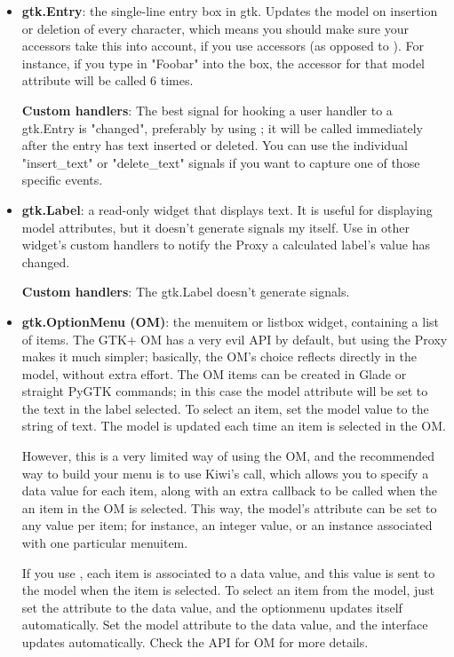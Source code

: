 \documentclass[a4paper]{howto}
\begin{document}
\begin{itemize}
\item {\bf gtk.Entry}: the single-line entry box in gtk. Updates the
model on insertion or deletion of every character, which means you
should make sure your accessors take this into account, if you use
accessors (as opposed to ). For instance, if you type in
"Foobar" into the box, the accessor for that model attribute will be
called 6 times.

{\bf Custom handlers}: The best signal for hooking a user handler to a
gtk.Entry is "changed", preferably by using ; it will be called immediately after the entry
has text inserted or deleted. You can use the individual "insert\_text"
or "delete\_text" signals if you want to capture one of those specific
events.

\item {\bf gtk.Label}: a read-only widget that displays text. It is
useful for displaying model attributes, but it doesn't generate signals
my itself. Use  in other widget's custom handlers to
notify the Proxy a calculated label's value has changed.

{\bf Custom handlers}: The gtk.Label doesn't generate signals.

\item {\bf gtk.OptionMenu (OM)}: the menuitem or listbox widget,
containing a list of items. The GTK+ OM has a very evil API by default,
but using the Proxy makes it much simpler; basically, the OM's choice
reflects directly in the model, without extra effort. The OM items can
be created in Glade or straight PyGTK commands; in this case the model
attribute will be set to the text in the label selected. To select an
item, set the model value to the string of text. The model is updated
each time an item is selected in the OM.

However, this is a very limited way of using the OM, and the recommended
way to build your menu is to use Kiwi's 
call, which allows you to specify a data value for each item, along with
an extra callback to be called when the an item in the OM is selected.
This way, the model's attribute can be set to any value per item; for
instance, an integer value, or an instance associated with one
particular menuitem.

If you use , each item is associated to a data value,
and this value is sent to the model when the item is selected. To select
an item from the model, just set the attribute to the data value, and
the optionmenu updates itself automatically. Set the model attribute to
the data value, and the interface updates automatically. Check the API
for OM for more details.


\end{itemize}
\end{document}
